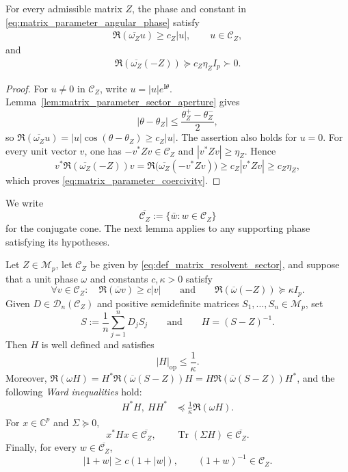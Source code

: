 \documentclass[EJP, preprint, NODS, nobera, nofontexpansion]{ejpecp}
\newcommand{\ii}{\mathbf{i}}
\DeclareMathOperator{\op}{op}
\DeclareMathOperator{\tr}{Tr}
\begin{document}
\begin{lemma}
\label{lem:matrix_parameter_supporting_phase}
For every admissible matrix \(Z\), the phase and constant in
\eqref{eq:matrix_parameter_angular_phase} satisfy
\begin{align}
    \Re(\overline{\omega_Z}u)\geq c_Z|u|,
    \qquad u\in\mathcal C_Z,
\end{align}
and
\begin{align}\label{eq:matrix_parameter_coercivity}
    \Re(\overline{\omega_Z}(-Z))
    \succeq c_Z\eta_Z I_p\succ0.
\end{align}
\end{lemma}

\begin{proof}
For \(u\neq0\) in \(\mathcal C_Z\), write \(u=|u|e^{\ii\theta}\).
Lemma~\ref{lem:matrix_parameter_sector_aperture} gives
\[
    |\theta-\theta_Z|\leq\frac{\theta_Z^+-\theta_Z^-}{2},
\]
so
\(\Re(\overline{\omega_Z}u)=|u|\cos(\theta-\theta_Z)\geq c_Z|u|\).
The assertion also holds for \(u=0\).
For every unit vector \(v\), one has
\(-v^*Zv\in\mathcal C_Z\) and \(|v^*Zv|\geq\eta_Z\). Hence
\[
    v^*\Re(\overline{\omega_Z}(-Z))v
    =\Re\bigl(\overline{\omega_Z}(-v^*Zv)\bigr)
    \geq c_Z|v^*Zv|\geq c_Z\eta_Z,
\]
which proves \eqref{eq:matrix_parameter_coercivity}.
\end{proof}

We write
\[
    \overline{\mathcal C_Z}:=\{\bar w:w\in\mathcal C_Z\}
\]
for the conjugate cone. The next lemma applies to any supporting phase
satisfying its hypotheses.

\begin{lemma}
\label{lem:distance_resolvent_and_ward}
Let \(Z\in\mathcal M_p\), let \(\mathcal C_Z\) be given by
\eqref{eq:def_matrix_resolvent_sector}, and suppose that a unit phase
\(\omega\) and constants \(c,\kappa>0\) satisfy
\begin{equation}\label{eq:sectorial_resolvent_hypotheses}
    \forall v\in \mathcal C_Z:\quad \Re(\overline{\omega}v)\geq c|v|
    \qquad
    \text{and}
    \qquad
    \Re(\overline{\omega}(-Z))\succeq\kappa I_p.
\end{equation}
Given \(D\in\mathcal D_n(\mathcal C_Z)\) and positive semidefinite
matrices \(S_1,\ldots,S_n\in\mathcal M_p\), set
\[
    S:=\frac1n\sum_{j=1}^nD_jS_j
    \qquad 
    \text{and}
    \qquad 
    H=(S-Z)^{-1}.
\]
Then \(H\) is well defined and satisfies
\[
    |H|_{\op}\leq\frac1\kappa.
\]
Moreover, $\Re(\omega H)=H^*\Re\!\left(\overline{\omega}(S-Z)\right)H
      =H\Re\!\left(\overline{\omega}(S-Z)\right)H^*$, and the following
\emph{Ward inequalities} hold:
\begin{align*}
    H^*H,\ HH^*
    &\preceq\frac1\kappa\Re(\omega H).
\end{align*}
For \(x\in\mathbb C^p\) and \(\Sigma\succeq0\),
\[
    x^*Hx\in\overline{\mathcal C_Z},
    \qquad
    \tr(\Sigma H)\in\overline{\mathcal C_Z}.
\]
Finally, for every \(w\in\overline{\mathcal C_Z}\),
\[
    |1+w|\geq c(1+|w|),
    \qquad (1+w)^{-1}\in\mathcal C_Z.
\]
\end{lemma}
\end{document}

